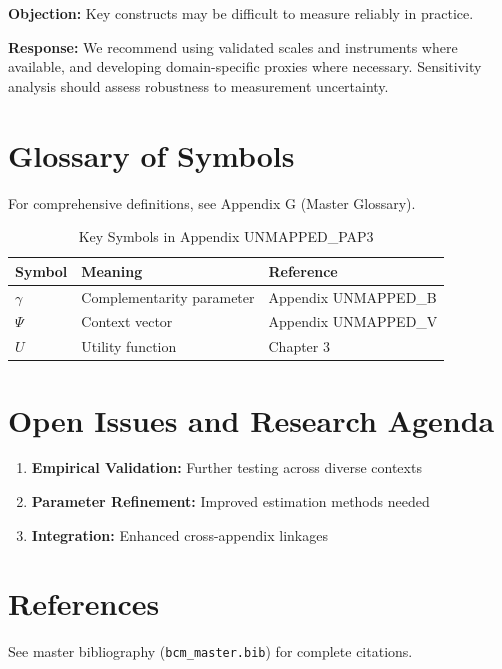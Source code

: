 \textbf{Objection:} Key constructs may be difficult to measure reliably in
practice.

\textbf{Response:} We recommend using validated scales and instruments where
available, and developing domain-specific proxies where necessary. Sensitivity
analysis should assess robustness to measurement uncertainty.



\section{Glossary of Symbols}
\label{sec:pap3-glossary}

For comprehensive definitions, see Appendix G (Master Glossary).

\begin{table}[htbp]
\centering
\caption{Key Symbols in Appendix UNMAPPED_PAP3}
\begin{tabular}{lll}
\toprule
\textbf{Symbol} & \textbf{Meaning} & \textbf{Reference} \\
\midrule
$\gamma$ & Complementarity parameter & Appendix UNMAPPED_B \\
$\Psi$ & Context vector & Appendix UNMAPPED_V \\
$U$ & Utility function & Chapter 3 \\
\bottomrule
\end{tabular}
\end{table}



\section{Open Issues and Research Agenda}
\label{sec:x-open}

\begin{enumerate}
    \item \textbf{Empirical Validation:} Further testing across diverse contexts
    \item \textbf{Parameter Refinement:} Improved estimation methods needed
    \item \textbf{Integration:} Enhanced cross-appendix linkages
\end{enumerate}

\section{References}
\label{sec:references}

See master bibliography (\texttt{bcm\_master.bib}) for complete citations.

\nocite{bcm_master}


